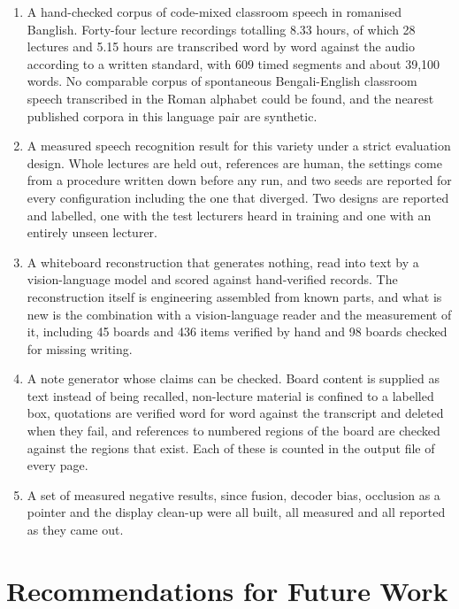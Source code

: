 \begin{enumerate}
  \item A hand-checked corpus of code-mixed classroom speech in romanised Banglish.
        Forty-four lecture recordings totalling 8.33 hours, of which 28 lectures and 5.15
        hours are transcribed word by word against the audio according to a written
        standard, with 609 timed segments and about 39,100 words. No comparable corpus of
        spontaneous Bengali-English classroom speech transcribed in the Roman alphabet
        could be found, and the nearest published corpora in this language pair are
        synthetic.

  \item A measured speech recognition result for this variety under a strict evaluation
        design. Whole lectures are held out, references are human, the settings come from
        a procedure written down before any run, and two seeds are reported for every
        configuration including the one that diverged. Two designs are reported and
        labelled, one with the test lecturers heard in training and one with an entirely
        unseen lecturer.

  \item A whiteboard reconstruction that generates nothing, read into text by a
        vision-language model and scored against hand-verified records. The reconstruction
        itself is engineering assembled from known parts, and what is new is the
        combination with a vision-language reader and the measurement of it, including 45
        boards and 436 items verified by hand and 98 boards checked for missing writing.

  \item A note generator whose claims can be checked. Board content is supplied as text
        instead of being recalled, non-lecture material is confined to a labelled box,
        quotations are verified word for word against the transcript and deleted when they
        fail, and references to numbered regions of the board are checked against the
        regions that exist. Each of these is counted in the output file of every page.

  \item A set of measured negative results, since fusion, decoder bias, occlusion as a
        pointer and the display clean-up were all built, all measured and all reported as
        they came out.
\end{enumerate}

\section{Recommendations for Future Work}

